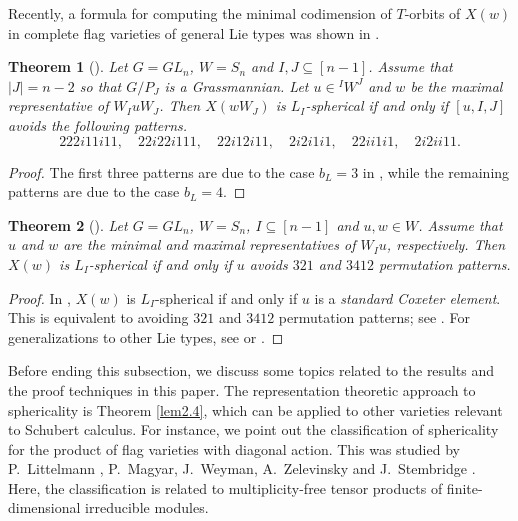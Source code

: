 \documentclass[12pt]{amsart}
\newtheorem{theorem}{Theorem}[section]
\theoremstyle{definition}
\theoremstyle{remark}
\begin{document}
Recently, a formula for computing the minimal codimension of $T$-orbits of $X(w)$ in complete flag varieties of general Lie types was shown in \cite[Corollary 1.3]{gao2024orbitstructurescomplexityschubert}.

\begin{theorem}[{\cite[Theorem 1.1.1]{MR4517644}}]\label{thm2.2}
Let $G=GL_n$, $W=S_n$ and $I ,J \subseteq [n-1]$. Assume that $|J| = n-2$ so that $G/P_J$ is a Grassmannian. Let $u \in {}^I W^J$ and $w$ be the maximal representative of $W_I u W_J$. Then $X(wW_J)$ is $L_I$-spherical if and only if $[u,I,J]$ avoids the following patterns.
\begin{equation}\label{eqn2.1}
222i11i11, \quad 22i22i111, \quad 22i12i11, \quad 2i2i1i1, \quad 22ii1i1, \quad 2i2ii11.
\end{equation}
\end{theorem}
\begin{proof}
The first three patterns are due to the case $b_L = 3$ in \cite[Theorem 1.1.1]{MR4517644}, while the remaining patterns are due to the case $b_L=4$.
\end{proof}

\begin{theorem}[{\cite[Theorem 1.3]{MR4615612}}]\label{thm2.3}
Let $G = GL_n$, $W=S_n$, $I \subseteq [n-1]$ and $u,w \in W$. Assume that $u$ and $w$ are the minimal and maximal representatives of $W_I u$, respectively. Then $X(w)$ is $L_I$-spherical if and only if $u$ avoids $321$ and $3412$ permutation patterns.
\end{theorem}
\begin{proof}
In \cite[\S 1.1]{MR4615612}, $X(w)$ is $L_I$-spherical if and only if $u$ is a \textit{standard Coxeter element}. This is equivalent to avoiding $321$ and $3412$ permutation patterns; see \cite[Theorem 4.3]{MR2333139}. For generalizations to other Lie types, see \cite[Theorem 1.3]{MR4690502} or \cite[Theorem 1.1]{MR4643501}.
\end{proof}

Before ending this subsection, we discuss some topics related to the results and the proof techniques in this paper. The representation theoretic approach to sphericality is Theorem \ref{lem2.4}, which can be applied to other varieties relevant to Schubert calculus. For instance, we point out the classification of sphericality for the product of flag varieties with diagonal action. This was studied by P.~Littelmann \cite{MR1276821}, P.~Magyar, J.~Weyman, A.~Zelevinsky \cite{MR1667147} and J.~Stembridge \cite{MR2017064}. Here, the classification is related to multiplicity-free tensor products of finite-dimensional irreducible modules.
\end{document}
